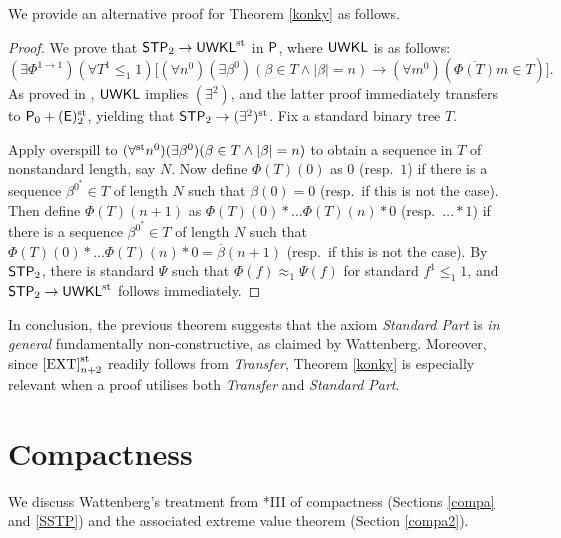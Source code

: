 \documentclass[reqno]{amsart}
\newcommand\be{\begin{equation}}
\newcommand\ee{\end{equation}}
\def\STP{\textup{\textsf{STP}}}
\def\UWKL{\textup{\textsf{UWKL}}}
\def\P{\textup{\textsf{P}}}
\def\st{\textup{st}}
\def\di{\rightarrow}
\numberwithin{equation}{section}
\numberwithin{thm}{section}
\begin{document}
We provide an alternative proof for Theorem \ref{konky} as follows.  
\begin{proof}
We prove that $\STP_{2}\di \UWKL^{\st}$ in $\P$, where $\UWKL$ is as follows:
\be
(\exists \Phi^{1\di 1})(\forall T^{1}\leq_{1}1)\big[ (\forall n^{0})(\exists \beta^{0})(\beta\in T\wedge |\beta|=n)\di (\forall m^{0})(\overline{\Phi(T)}m\in T)  \big].
\ee
As proved in \cite{kooltje}, $\UWKL$ implies $(\exists^{2})$, and the latter proof immediately transfers to $\P_{0}+(\textsf{\textup{E}})^{\st}_{2}$, yielding that $\STP_{2}\di (\exists^{2})^{\st}$.  Fix a standard binary tree $T$.

\medskip
  
Apply overspill to $(\forall^{\st} n^{0})(\exists \beta^{0})(\beta\in T\wedge |\beta|=n)$ to obtain a sequence in $T$ of nonstandard length, say $N$.
Now define $\Phi(T)(0)$ as $0$ (resp.\ $1$) if there is a sequence $\beta^{0^{*}}\in T$ of length $N$ such that $\beta(0)=0$ (resp.\ if this is not the case).  Then define $\Phi(T)(n+1)$ as $\Phi(T)(0)*\dots \Phi(T)(n)*0$ (resp.\ $\dots*1$) if there is a sequence $\beta^{0^{*}} \in T$ of length $N$ such that $\Phi(T)(0)*\dots \Phi(T)(n)*0=\overline{\beta}(n+1)$ (resp.\ if this is not the case).  By $\STP_{2}$, there is standard $\Psi$ such that $\Phi(f)\approx_{1}\Psi(f)$ for standard $f^{1}\leq_{1}1$, and $\STP_{2}\di \UWKL^{\st}$ follows immediately.  
\end{proof}
In conclusion, the previous theorem suggests that the axiom \emph{Standard Part} is \emph{in general} fundamentally non-constructive, as claimed by Wattenberg.  
Moreover, since $\eqref{EXT}_{n+2}^{\st}$ readily follows from \emph{Transfer}, Theorem \ref{konky} is especially relevant when a proof utilises both \emph{Transfer} and \emph{Standard Part}.  




\section{Compactness}\label{fraco}
We discuss Wattenberg's treatment from \cite{watje}*{III} of compactness (Sections \ref{compa} and \ref{SSTP}) and the associated extreme value theorem (Section \ref{compa2}).  %
\end{document}
